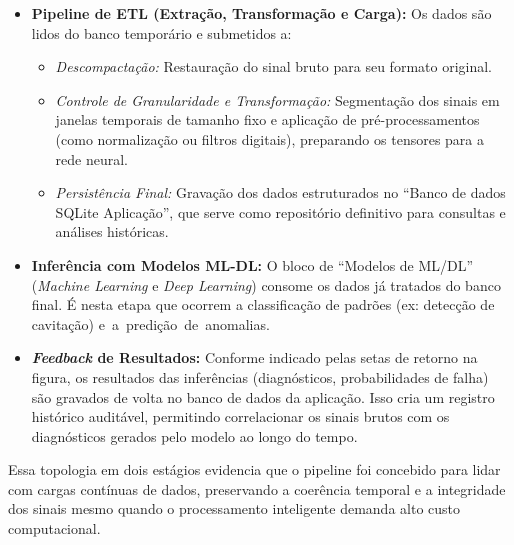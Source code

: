 \begin{itemize} 
	\item \textbf{Pipeline de ETL (Extração, Transformação e Carga):} Os dados são lidos do banco temporário e submetidos a: \begin{itemize} 
		
	\item \textit{Descompactação:} Restauração do sinal bruto para seu formato original.
	
	\item \textit{Controle de Granularidade e Transformação:} Segmentação dos sinais em janelas temporais de tamanho fixo e aplicação de pré-processamentos (como normalização ou filtros digitais), preparando os tensores para a rede neural. 
	
	\item \textit{Persistência Final:} Gravação dos dados estruturados no ``Banco de dados SQLite Aplicação'', que serve como repositório definitivo para consultas e análises históricas. \end{itemize}
	
	\item \textbf{Inferência com Modelos ML-DL:} O bloco de ``Modelos de ML/DL'' (\textit{Machine Learning} e \textit{Deep Learning}) consome os dados já tratados do banco final. É nesta etapa que ocorrem a classificação de padrões (ex: detecção de cavitação) \mbox{e a predição de anomalias.}
	
	\item \textbf{\textit{Feedback} de Resultados:} Conforme indicado pelas setas de retorno na figura, os resultados das inferências (diagnósticos, probabilidades de falha) são gravados de volta no banco de dados da aplicação. Isso cria um registro histórico auditável, permitindo correlacionar os sinais brutos com os diagnósticos gerados pelo modelo ao longo do tempo.
\end{itemize}

Essa topologia em dois estágios evidencia que o pipeline foi concebido para lidar com cargas contínuas de dados, preservando a coerência temporal e a integridade dos sinais mesmo quando o processamento inteligente demanda alto custo computacional.

